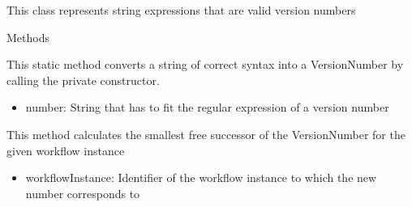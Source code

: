 This class represents string expressions that are valid version numbers
\begin{methodenv}{Methods}

This static method converts a string of correct syntax into a VersionNumber by calling the private constructor.

\begin{itemize}
	\item{number:}
	String that has to fit the regular expression of a version number
\end{itemize}

This method calculates the smallest free successor of the VersionNumber for the given workflow instance

\begin{itemize}
	\item{workflowInstance:}
	Identifier of the workflow instance to which the new number corresponds to
\end{itemize}
\end{methodenv}
\newpage

